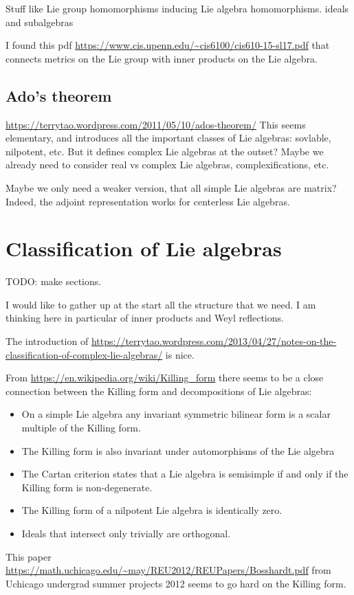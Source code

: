 \documentclass[twoside,11pt,a4paper,leqno]{article}
\numberwithin{equation}{section}
\theoremstyle{plain}
\theoremstyle{definition}
\begin{document}
Stuff like Lie group homomorphisms inducing Lie algebra homomorphisms.
ideals and subalgebras

I found this pdf \url{https://www.cis.upenn.edu/~cis6100/cis610-15-sl17.pdf} that connects metrics on the Lie group with inner products on the Lie algebra.


\subsection{Ado's theorem}
\url{https://terrytao.wordpress.com/2011/05/10/ados-theorem/}
This seems elementary, and introduces all the important classes of Lie algebras: sovlable, nilpotent, etc. But it defines complex Lie algebras at the outset? Maybe we already need to consider real vs complex Lie algebras, complexifications, etc.

Maybe we only need a weaker version, that all simple Lie algebras are matrix?
Indeed, the adjoint representation works for centerless Lie algebras.



\section{Classification of Lie algebras}

TODO: make sections.

I would like to gather up at the start all the structure that we need. I am thinking here in particular of inner products and Weyl reflections.

The introduction of \url{https://terrytao.wordpress.com/2013/04/27/notes-on-the-classification-of-complex-lie-algebras/} is nice.

From \url{https://en.wikipedia.org/wiki/Killing_form} there seems to be a close connection between the Killing form and decompositions of Lie algebras:
\begin{itemize}
\item On a simple Lie algebra any invariant symmetric bilinear form is a scalar multiple of the Killing form.
\item The Killing form is also invariant under automorphisms of the Lie algebra
\item The Cartan criterion states that a Lie algebra is semisimple if and only if the Killing form is non-degenerate.
\item The Killing form of a nilpotent Lie algebra is identically zero.
\item Ideals that intersect only trivially are orthogonal.
\end{itemize}
This paper \url{https://math.uchicago.edu/~may/REU2012/REUPapers/Bosshardt.pdf} from Uchicago undergrad summer projects 2012 seems to go hard on the Killing form.
\end{document}
